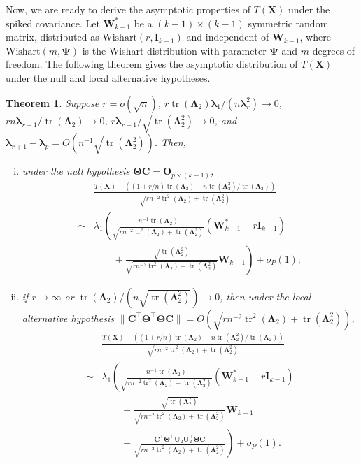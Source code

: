 \documentclass[12pt]{article} %
\DeclareMathOperator{\mytr}{tr}
\newcommand{\bX}{\mathbf{X}}
\newcommand{\bC}{\mathbf{C}}
\newcommand{\bO}{\mathbf{O}}
\newcommand{\bI}{\mathbf{I}}
\newcommand{\bU}{\mathbf{U}}
\newcommand{\bW}{\mathbf{W}}
\newcommand{\bfsym}[1]{\ensuremath{\boldsymbol{#1}}}
\def\blambda {\bfsym {\lambda}}
\def\bLambda {\bfsym {\Lambda}}
\def\bTheta {\bfsym {\Theta}}
\def\bPsi {\bfsym {\Psi}}
\newtheorem{theorem}{Theorem}
\theoremstyle{definition}
\begin{document}
Now, we are ready to derive the asymptotic properties of $T(\bX)$ under the spiked covariance.
Let $\bW^*_{k-1}$ be a $(k-1)\times (k-1)$ symmetric random matrix, distributed as $\textrm{Wishart}(r,\bI_{k-1})$ and independent of $\bW_{k-1}$, where $\textrm{Wishart}(m,\bPsi)$ is the Wishart distribution with parameter $\bPsi$ and $m$ degrees of freedom.
The following theorem gives the asymptotic distribution of $T(\bX)$ under the null and local alternative hypotheses.
\begin{theorem}\label{thm1}
    Suppose $r=o(\sqrt{n})$, $r\mytr(\bLambda_2)\blambda_1/(n\blambda_r^2)\to 0$, $rn\blambda_{r+1} /\mytr(\bLambda_2)\to 0$,
    $r\blambda_{r+1}/\sqrt{\mytr(\bLambda_2^2)}\to 0$, and $\blambda_{r+1}-\blambda_p=O(n^{-1}\sqrt{\mytr(\bLambda_2^2)})$.
    Then,
    \begin{enumerate}[(i)]
        \item 
            under the null hypothesis $\bTheta \bC=\bO_{p\times (k-1)}$,
\begin{equation*}
    \begin{split}
&
\frac{
    T(\bX)
    -
    \left((1+r/n)\mytr(\bLambda_2)-n\mytr(\bLambda_2^2)/\mytr(\bLambda_2)\right)
}{
    \sqrt{
        rn^{-2}\mytr^2(\bLambda_2)+ 
        \mytr(\bLambda_2^2)
    }
}
\\
\sim &
\lambda_1
\left(
\frac{
    n^{-1} \mytr(\bLambda_2)
}{
    \sqrt{
        rn^{-2} \mytr^2 (\bLambda_2) + \mytr(\bLambda_2^2)
    }
}
(\bW_{k-1}^* - r\bI_{k-1})
\right.
\\
&\quad\quad+
\left.
\frac{
    \sqrt{\mytr(\bLambda_2^2)}
}{
    \sqrt{
        rn^{-2} \mytr^2 (\bLambda_2) + \mytr(\bLambda_2^2)
    }
}
\bW_{k-1}
\right)
+o_P(1);
    \end{split}
\end{equation*}
        \item
            if $r\to \infty$ or $\mytr(\bLambda_2)/(n \sqrt{\mytr(\bLambda_2^2)})\to 0$, then under the local alternative hypothesis $\|\bC^\top \bTheta^\top \bTheta \bC\|=O(\sqrt{
        rn^{-2} \mytr^2 (\bLambda_2) + \mytr(\bLambda_2^2)
            })$,
\begin{equation*}
    \begin{split}
&
\frac{
    T(\bX)
    -
    \left((1+r/n)\mytr(\bLambda_2)-n\mytr(\bLambda_2^2)/\mytr(\bLambda_2)\right)
}{
    \sqrt{
        rn^{-2}\mytr^2(\bLambda_2)+ 
        \mytr(\bLambda_2^2)
    }
}
\\
\sim &
\lambda_1
\left(
\frac{
    n^{-1} \mytr(\bLambda_2)
}{
    \sqrt{
        rn^{-2} \mytr^2 (\bLambda_2) + \mytr(\bLambda_2^2)
    }
}
(\bW_{k-1}^* - r\bI_{k-1})
\right.
\\
&
\quad\quad
+
\frac{
    \sqrt{\mytr(\bLambda_2^2)}
}{
    \sqrt{
        rn^{-2} \mytr^2 (\bLambda_2) + \mytr(\bLambda_2^2)
    }
}
\bW_{k-1}
\\
&
\quad\quad
+\left.
\frac{
    \bC^\top \bTheta^\top \bU_2 \bU_2^\top \bTheta \bC
}{
    \sqrt{
        rn^{-2} \mytr^2 (\bLambda_2) + \mytr(\bLambda_2^2)
    }
}
\right)
+o_P(1).
    \end{split}
\end{equation*}
    \end{enumerate}
\end{theorem}
\end{document}
